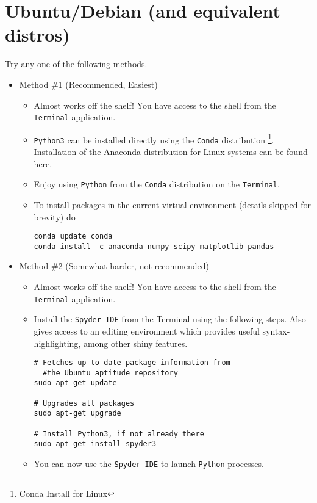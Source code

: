 \documentclass[11pt]{article}
\begin{document}
\section*{Ubuntu/Debian (and equivalent distros)}
\label{sec:org269a52c}
Try any one of the following methods.

\begin{itemize}
\item Method \#1 (Recommended, Easiest)
\label{sec:org1956c1d}
\begin{itemize}
\item Almost works off the shelf! You have access to the shell from the \texttt{Terminal} application.
\item \texttt{Python3} can be installed directly using the \texttt{Conda} distribution \footnote{\href{https://www.anaconda.com/download/\#linux}{Conda Install for Linux}\label{org5ecec2a}}. \href{https://www.anaconda.com/download/\#linux}{Installation of the Anaconda distribution for Linux systems can be found here.}
\item Enjoy using \texttt{Python} from the \texttt{Conda} distribution on the \texttt{Terminal}.
\item To install packages in the current virtual environment (details skipped for
brevity) do
\begin{verbatim}
conda update conda
conda install -c anaconda numpy scipy matplotlib pandas
\end{verbatim}
\end{itemize}

\item Method \#2 (Somewhat harder, not recommended)
\label{sec:org3f6eda2}

\begin{itemize}
\item Almost works off the shelf! You have access to the shell from the \texttt{Terminal} application.
\item Install the \texttt{Spyder IDE} from the Terminal using the following steps. Also
gives access to an editing environment which provides useful
syntax-highlighting, among other shiny features.

\begin{verbatim}
# Fetches up-to-date package information from
  #the Ubuntu aptitude repository
sudo apt-get update

# Upgrades all packages
sudo apt-get upgrade

# Install Python3, if not already there
sudo apt-get install spyder3
\end{verbatim}
\item You can now use the \texttt{Spyder IDE} to launch \texttt{Python} processes.
\end{itemize}


\end{itemize}
\end{document}
